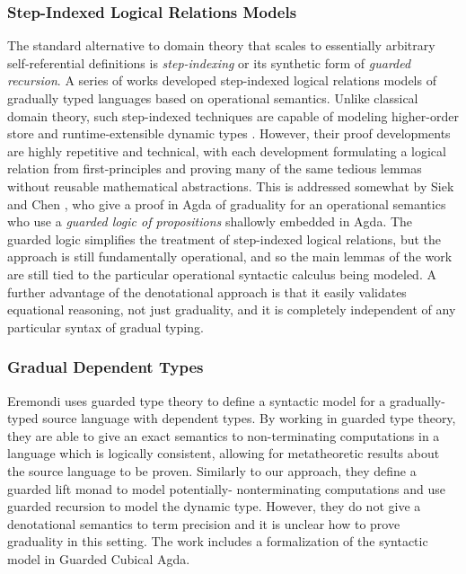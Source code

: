 \subsubsection{Step-Indexed Logical Relations Models}
The standard alternative to domain theory that scales to essentially
arbitrary self-referential definitions is \emph{step-indexing} or its
synthetic form of \emph{guarded recursion}. A series of works
\cite{new-ahmed2018, new-licata-ahmed2019, new-jamner-ahmed19}
developed step-indexed logical relations models of gradually typed
languages based on operational semantics. Unlike classical domain
theory, such step-indexed techniques are capable of modeling
higher-order store and runtime-extensible dynamic types
\cite{appelmcallester01,ahmed06,neis09,new-jamner-ahmed19}. However,
their proof developments are highly repetitive and technical, with
each development formulating a logical relation from first-principles
and proving many of the same tedious lemmas without reusable
mathematical abstractions.
%
%
This is addressed somewhat by Siek and Chen
\cite{siek-chen2021}, who give a proof in Agda of graduality for an
operational semantics who use a \emph{guarded logic of propositions}
shallowly embedded in Agda. The guarded logic simplifies the treatment
of step-indexed logical relations, but the approach is still
fundamentally operational, and so the main lemmas of the work are
still tied to the particular operational syntactic calculus being
modeled. A further advantage of the denotational approach is that it
easily validates equational reasoning, not just graduality, and it is
completely independent of any particular syntax of gradual typing.


\subsubsection{Gradual Dependent Types}
Eremondi \cite{Eremondi_2023} uses guarded type theory to
define a syntactic model for a gradually-typed source
language with dependent types. By working in guarded type theory, they are
able to give an exact semantics to non-terminating computations in a language
which is logically consistent, allowing for metatheoretic results about the
source language to be proven.
%
Similarly to our approach, they define a guarded lift monad to model potentially-
nonterminating computations and use guarded recursion to model the dynamic type.
However, they do not give a denotational semantics to term precision and it is unclear
how to prove graduality in this setting.
The work includes a formalization of the syntactic model in Guarded Cubical Agda.


